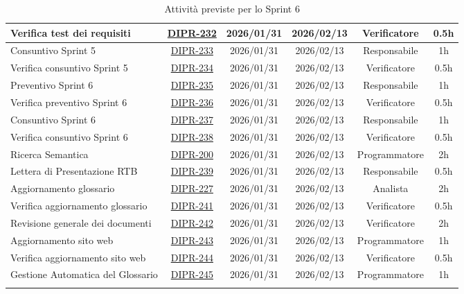 \documentclass[a4paper,12pt]{article}
\begin{document}
\begin{longtable}{|p{4cm}|c|c|c|c|c|}
        \hline
        Verifica test dei requisiti & \href{https://7zpus.atlassian.net/browse/DIPR-232}{DIPR-232} & 2026/01/31 & 2026/02/13 & Verificatore & 0.5h \\
        \hline
        Consuntivo Sprint 5 & \href{https://7zpus.atlassian.net/browse/DIPR-233}{DIPR-233} & 2026/01/31 & 2026/02/13 & Responsabile & 1h \\
        \hline
        Verifica consuntivo Sprint 5 & \href{https://7zpus.atlassian.net/browse/DIPR-234}{DIPR-234} & 2026/01/31 & 2026/02/13 & Verificatore & 0.5h \\
        \hline
        Preventivo Sprint 6 & \href{https://7zpus.atlassian.net/browse/DIPR-235}{DIPR-235} & 2026/01/31 & 2026/02/13 & Responsabile & 1h \\
        \hline
        Verifica preventivo Sprint 6 & \href{https://7zpus.atlassian.net/browse/DIPR-236}{DIPR-236} & 2026/01/31 & 2026/02/13 & Verificatore & 0.5h \\
        \hline
        Consuntivo Sprint 6 & \href{https://7zpus.atlassian.net/browse/DIPR-237}{DIPR-237} & 2026/01/31 & 2026/02/13 & Responsabile & 1h \\
        \hline
        Verifica consuntivo Sprint 6 & \href{https://7zpus.atlassian.net/browse/DIPR-238}{DIPR-238} & 2026/01/31 & 2026/02/13 & Verificatore & 0.5h \\
        \hline
        Ricerca Semantica & \href{https://7zpus.atlassian.net/browse/DIPR-200}{DIPR-200} & 2026/01/31 & 2026/02/13 & Programmatore & 2h \\
        \hline
        Lettera di Presentazione RTB & \href{https://7zpus.atlassian.net/browse/DIPR-239}{DIPR-239} & 2026/01/31 & 2026/02/13 & Responsabile & 0.5h \\
        \hline
        Aggiornamento glossario & \href{https://7zpus.atlassian.net/browse/DIPR-227}{DIPR-227} & 2026/01/31 & 2026/02/13 & Analista & 2h \\
        \hline
        Verifica aggiornamento glossario & \href{https://7zpus.atlassian.net/browse/DIPR-241}{DIPR-241} & 2026/01/31 & 2026/02/13 & Verificatore & 0.5h \\
        \hline
        Revisione generale dei documenti & \href{https://7zpus.atlassian.net/browse/DIPR-242}{DIPR-242} & 2026/01/31 & 2026/02/13 & Verificatore & 2h \\
        \hline
        Aggiornamento sito web & \href{https://7zpus.atlassian.net/browse/DIPR-243}{DIPR-243} & 2026/01/31 & 2026/02/13 & Programmatore & 1h \\
        \hline
        Verifica aggiornamento sito web & \href{https://7zpus.atlassian.net/browse/DIPR-244}{DIPR-244} & 2026/01/31 & 2026/02/13 & Verificatore & 0.5h \\
        \hline
        Gestione Automatica del Glossario & \href{https://7zpus.atlassian.net/browse/DIPR-245}{DIPR-245} & 2026/01/31 & 2026/02/13 & Programmatore & 1h \\
        \hline
    \caption{Attività previste per lo Sprint 6}
    \end{longtable}
\end{document}
